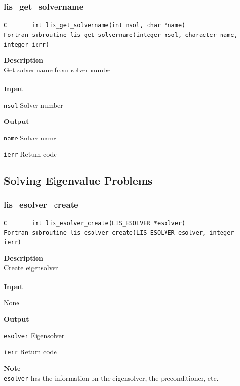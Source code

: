 \documentclass[a4paper]{article}
\newcommand{\namelistlabel}[1]{\mbox{#1}\hfill}
\newenvironment{namelist}[1]{%
 \begin{list}{}
  {\let\makelabel\namelistlabel
  \settowidth{\labelwidth}{#1}
  \setlength{\leftmargin}{1.1\labelwidth}}
}{%
\end{list}}
\begin{document}
  \subsubsection{lis\_get\_solvername}
\begin{screen}
\verb|C       int lis_get_solvername(int nsol, char *name)|\\
\verb|Fortran subroutine lis_get_solvername(integer nsol, character name, integer ierr)|
\end{screen}
{\bf Description}\\
\indent
Get solver name from solver number
\\ \\
\noindent
{\bf Input}
\begin{namelist}{XXXXXXXXXXXXXXXXXXXX}
\item[\tt nsol] Solver number
\end{namelist}
{\bf Output}
\begin{namelist}{XXXXXXXXXXXXXXXXXXXX}
\item[\tt name] Solver name
\item[\tt ierr] Return code
\end{namelist}
\newpage
\subsection{Solving Eigenvalue Problems}
  \subsubsection{lis\_esolver\_create}
\begin{screen}
\verb|C       int lis_esolver_create(LIS_ESOLVER *esolver)|\\
\verb|Fortran subroutine lis_esolver_create(LIS_ESOLVER esolver, integer ierr)|
\end{screen}
{\bf Description}\\
\indent
Create eigensolver
\\ \\
\noindent
{\bf Input}
\begin{namelist}{XXXXXXXXXXXXXXXXXXXX}
\item[None]
\end{namelist}
{\bf Output}
\begin{namelist}{XXXXXXXXXXXXXXXXXXXX}
\item[\tt esolver] Eigensolver
\item[\tt ierr] Return code
\end{namelist}
{\bf Note}\\
\indent
\verb|esolver| has the information on the eigensolver, the preconditioner, etc.
\end{document}
